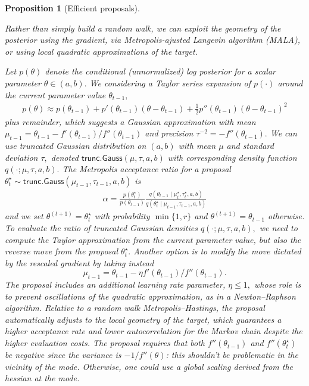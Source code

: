 \documentclass[
  11pt,
  letterpaper,
]{scrbook}
\theoremstyle{definition}
\theoremstyle{plain}
\theoremstyle{plain}
\newtheorem{proposition}{Proposition}[chapter]
\theoremstyle{definition}
\theoremstyle{definition}
\theoremstyle{remark}
\begin{document}
\begin{proposition}[Efficient
proposals]\protect\hypertarget{prp-mala}{}\label{prp-mala}

Rather than simply build a random walk, we can exploit the geometry of
the posterior using the gradient, via Metropolis-ajusted Langevin
algorithm (MALA), or using local quadratic approximations of the target.

Let \(p(\theta)\) denote the conditional (unnormalized) log posterior
for a scalar parameter \(\theta \in (a, b).\) We considering a Taylor
series expansion of \(p(\cdot)\) around the current parameter value
\(\theta_{t-1},\) \begin{align*}
 p(\theta) \approx p(\theta_{t-1}) + p'(\theta_{t-1})(\theta - \theta_{t-1}) + \frac{1}{2} p''(\theta_{t-1})(\theta - \theta_{t-1})^2
\end{align*} plus remainder, which suggests a Gaussian approximation
with mean
\(\mu_{t-1} = \theta_{t-1} - f'(\theta_{t-1})/f''(\theta_{t-1})\) and
precision \(\tau^{-2} = -f''(\theta_{t-1}).\) We can use truncated
Gaussian distribution on \((a, b)\) with mean \(\mu\) and standard
deviation \(\tau,\) denoted \(\mathsf{trunc. Gauss}(\mu, \tau, a, b)\)
with corresponding density function \(q(\cdot; \mu, \tau, a, b).\) The
Metropolis acceptance ratio for a proposal
\(\theta^{\star}_{t} \sim \mathsf{trunc. Gauss}(\mu_{t-1}, \tau_{t-1}, a, b)\)
is \begin{align*}
 \alpha = \frac{p(\theta^{\star}_{t})}{p(\theta_{t-1})} \frac{ q(\theta_{t-1} \mid \mu_{t}^{\star}, \tau_{t}^{\star}, a, b)}{q(\theta^{\star}_{t} \mid \mu_{t-1}, \tau_{t-1}, a, b)}
\end{align*} and we set \(\theta^{(t+1)} = \theta^{\star}_{t}\) with
probability \(\min\{1, r\}\) and \(\theta^{(t+1)} = \theta_{t-1}\)
otherwise. To evaluate the ratio of truncated Gaussian densities
\(q(\cdot; \mu, \tau, a, b),\) we need to compute the Taylor
approximation from the current parameter value, but also the reverse
move from the proposal \(\theta^{\star}_{t}.\) Another option is to
modify the move dictated by the rescaled gradient by taking instead
\[\mu_{t-1} = \theta_{t-1} - \eta f'(\theta_{t-1})/f''(\theta_{t-1}).\]
The proposal includes an additional learning rate parameter,
\(\eta \leq 1,\) whose role is to prevent oscillations of the quadratic
approximation, as in a Newton--Raphson algorithm. Relative to a random
walk Metropolis--Hastings, the proposal automatically adjusts to the
local geometry of the target, which guarantees a higher acceptance rate
and lower autocorrelation for the Markov chain despite the higher
evaluation costs. The proposal requires that both \(f''(\theta_{t-1})\)
and \(f''(\theta^{\star}_{t})\) be negative since the variance is
\(-1/f''(\theta)\): this shouldn't be problematic in the vicinity of the
mode. Otherwise, one could use a global scaling derived from the hessian
at the mode.


\end{proposition}
\end{document}

